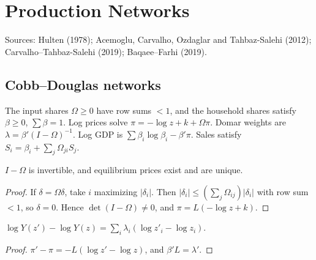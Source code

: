 \chapter{Production Networks}
\label{chap:prod_networks}

Sources: Hulten (1978); Acemoglu, Carvalho, Ozdaglar and Tahbaz-Salehi (2012); Carvalho--Tahbaz-Salehi (2019);
Baqaee--Farhi (2019).

\section{Cobb--Douglas networks}

\begin{definition}
\label{def:pn_network}
\leanok
The input shares $\Omega \ge 0$ have row sums $<1$, and the household shares satisfy $\beta \ge 0$, $\sum\beta = 1$.
Log prices solve $\pi = -\log z + k + \Omega\pi$. Domar weights are $\lambda = \beta'(I-\Omega)^{-1}$. Log GDP
is $\sum\beta_i\log\beta_i - \beta'\pi$. Sales satisfy $S_i = \beta_i + \sum_j\Omega_{ji}S_j$.
\end{definition}

\begin{lemma}
\label{lem:pn_prices}
\leanok
{}
$I - \Omega$ is invertible, and equilibrium prices exist and are unique.
\end{lemma}
\begin{proof}
\leanok
If $\delta = \Omega\delta$, take $i$ maximizing $|\delta_i|$. Then $|\delta_i| \le (\sum_j\Omega_{ij})|\delta_i|$ with
row sum $<1$, so $\delta = 0$. Hence $\det(I-\Omega) \ne 0$, and $\pi = L(-\log z + k)$.
\end{proof}

\begin{theorem}
\label{thm:pn_hulten}
\leanok
{}
$\log Y(z') - \log Y(z) = \sum_i\lambda_i(\log z'_i - \log z_i)$.
\end{theorem}
\begin{proof}
\leanok
$\pi' - \pi = -L(\log z' - \log z)$, and $\beta'L = \lambda'$.
\end{proof}

